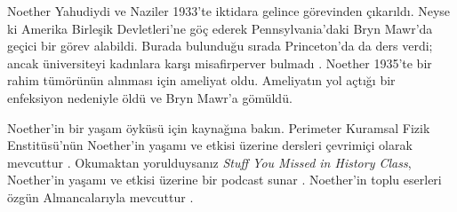 \documentclass[../../../include/open-logic-section]{subfiles}
\begin{document}
Noether Yahudiydi ve Naziler 1933'te iktidara gelince görevinden çıkarıldı.
Neyse ki Amerika Birleşik Devletleri'ne göç ederek Pennsylvania'daki Bryn
Mawr'da geçici bir görev alabildi. Burada bulunduğu sırada Princeton'da da
ders verdi; ancak üniversiteyi kadınlara karşı misafirperver bulmadı
\citep[81]{Dick1981}. Noether 1935'te bir rahim tümörünün alınması için
ameliyat oldu. Ameliyatın yol açtığı bir enfeksiyon nedeniyle öldü ve Bryn
Mawr'a gömüldü.

\begin{reading} 
Noether'in bir yaşam öyküsü için \citet{Dick1981} kaynağına bakın. Perimeter
Kuramsal Fizik Enstitüsü'nün Noether'in yaşamı ve etkisi üzerine dersleri
çevrimiçi olarak mevcuttur \citep{Perimeter2015}. Okumaktan yorulduysanız
\emph{Stuff You Missed in History Class}, Noether'in yaşamı ve etkisi üzerine
bir podcast sunar \citep{Frey2015}. Noether'in toplu eserleri özgün
Almancalarıyla mevcuttur \citep{Noether1983}.
\end{reading}
\end{document}
